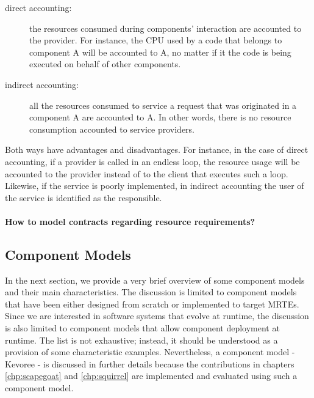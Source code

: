 \begin{description}
\item[direct accounting:] the resources consumed during
components' interaction are accounted to the provider.
For instance, the CPU used by a code that belongs
to component A will be accounted to A, no matter if it the code is being executed on behalf of other components.

\item[indirect accounting:] all the resources consumed to service a request that was originated in a component A are accounted to A.
In other words, there is no resource consumption accounted to service providers.
\end{description}

Both ways have advantages and disadvantages.
For instance, in the case of direct accounting, if a provider is
called in an endless loop, the resource usage will be accounted
to the provider instead of to the client that executes such a loop.
Likewise, if the service is poorly implemented, in indirect accounting the user of the service is identified as the responsible.

\paragraph{How to model contracts regarding resource requirements?}

%
%
%
%

\subsection{Component Models}

In the next section, we provide a very brief overview of some component models and their main characteristics.
The discussion is limited to component models that have been either designed from scratch or implemented to target MRTEs.
Since we are interested in software systems that evolve at runtime, the discussion is also limited to component models that allow component deployment at runtime.
The list is not exhaustive; instead, it should be understood as a provision of some characteristic examples.
Nevertheless, a component model - Kevoree -  is discussed in further details because the contributions in chapters \ref{chp:scapegoat} and \ref{chp:squirrel}
are implemented and evaluated using such a component model.

